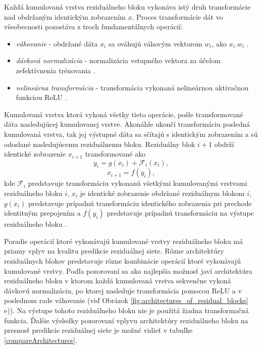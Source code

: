 Každá kumulovaná vrstva reziduálneho bloku vykonáva istý druh transformácie nad obdržaným identickým zobrazením $x$. Proces transformácie dát vo všeobecnosti pozostáva z troch fundamentálnych operácií:
\begin{itemize}
    \item \textit{váhovanie} - obdržané dáta $x_i$ sa ováhujú váhovým vektorom $w_i$, ako $x_i . w_i$ \cite{He2016, Goh1995}.
    \item \textit{dávková normalizácia} - normalizácia vstupného vektora za účelom zefektívnenia trénovania \cite{Ioffe2015, Goh1995}.
    \item \textit{nelineárna transformácia} - transformácia vykonaná nelineárnou aktivačnou funkciou ReLU \cite{Xu2015, Goh1995}.
\end{itemize}
Kumulovaná vrstva ktorá vykoná všetky tieto operácie, pošle transformované dáta nasledujúcej kumulovanej vrstve. Akonáhle ukončí transformáciu posledná kumulovaná vrstva, tak jej výstupné dáta sa sčítajú s identickým zobrazením a sú odoslané nasledujúcemu reziduálnemu bloku. Reziduálny blok $i+1$ obdrží identické zobrazenie $x_{i+1}$ transformované ako
\[y_i=g(x_i)+\mathcal{F}_i(x_i),\]
\[x_{i+1}=f(y_i),\]
kde $\mathcal{F}_i$ predstavuje transformáciu vykonanú všetkými kumulovanými vrstvami reziduálneho bloku $i$, $x_i$ je identické zobrazenie obdržané reziduálnym blokom $i$, $g(x_i)$ predstavuje prípadnú transformáciu identického zobrazenia pri prechode identitným prepojením a $f(y_i)$ predstavuje prípadnú transformáciu na výstupe reziduálneho bloku \cite{Wu2017, He2016}.

Poradie operácií ktoré vykonávajú kumulované vrstvy reziduálneho bloku má priamy vplyv na kvalitu predikcie reziduálnej siete. Rôzne architektúry reziduálnych blokov predstavuje rôzne kombinácie operácií ktoré vykonávajú kumulované vrstvy. Podľa pozorovaní \cite{He2016} sa ako najlepšia možnosť javí architektúra reziduálneho bloku v ktorom každá kumulovaná vrstva sekvenčne vykoná dávkovú normalizáciu, po ktorej nasleduje transformácia pomocou ReLU a v poslednom rade váhovanie (viď Obrázok \ref{fig:architectures_of_residual_blocks} e)). Na výstupe tohoto reziduálneho bloku nie je použitá žiadna transformačná funkcia. Ďalšie výsledky pozorovaní vplyvu architektúry reziduálneho bloku na presnosť predikcie reziduálnej siete je možné vidieť v tabuľke \ref{compareArchitectures}.

